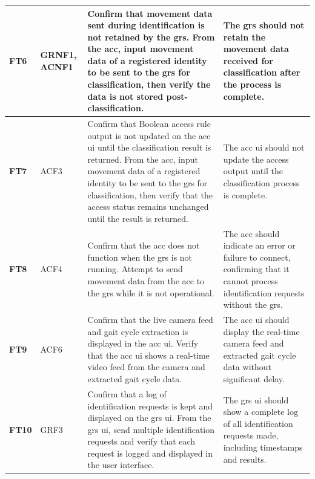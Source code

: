 \begin{scriptsize}
\begin{longtable}{|p{}|p{}|p{}|p{}|}
        \textbf{FT6}  & GRNF1, ACNF1                                   & Confirm that movement data sent during identification is not retained by the \ac{grs}. From the \ac{acc}, input movement data of a registered identity to be sent to the \ac{grs} for classification, then verify the data is not stored post-classification.                                                                 & The \ac{grs} should not retain the movement data received for classification after the process is complete.                                  \\ \hline
        \textbf{FT7}  & ACF3                                           & Confirm that Boolean access rule output is not updated on the \ac{acc} \ac{ui} until the classification result is returned. From the \ac{acc}, input movement data of a registered identity to be sent to the \ac{grs} for classification, then verify that the access status remains unchanged until the result is returned. & The \ac{acc} \ac{ui} should not update the access output until the classification process is complete.                                       \\ \hline
        \textbf{FT8}  & ACF4                                           & Confirm that the \ac{acc} does not function when the \ac{grs} is not running. Attempt to send movement data from the \ac{acc} to the \ac{grs} while it is not operational.                                                                                                                                                    & The \ac{acc} should indicate an error or failure to connect, confirming that it cannot process identification requests without the \ac{grs}. \\ \hline
        \textbf{FT9}  & ACF6                                           & Confirm that the live camera feed and gait cycle extraction is displayed in the \ac{acc} \ac{ui}. Verify that the \ac{acc} \ac{ui} shows a real-time video feed from the camera and extracted gait cycle data.                                                                                                                & The \ac{acc} \ac{ui} should display the real-time camera feed and extracted gait cycle data without significant delay.                       \\ \hline
        \textbf{FT10} & GRF3                                           & Confirm that a log of identification requests is kept and displayed on the \ac{grs} \ac{ui}. From the \ac{grs} \ac{ui}, send multiple identification requests and verify that each request is logged and displayed in the user interface.                                                                                     & The \ac{grs} \ac{ui} should show a complete log of all identification requests made, including timestamps and results.
    \end{longtable}
\end{scriptsize}

